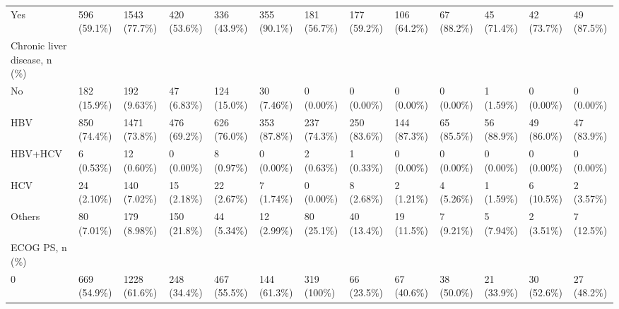 \begin{landscape}
\begin{center}
\begin{longtable}{p{6.0cm}p{3.0cm}p{3.0cm}p{3.0cm}p{3.0cm}p{3.0cm}p{3.0cm}p{3.0cm}p{3.0cm}p{3.0cm}p{3.0cm}p{3.0cm}p{3.0cm}}
    Yes &   596 (59.1\%)    &   1543 (77.7\%)   &   420 (53.6\%)    &   336 (43.9\%)    &   355 (90.1\%)    &   181 (56.7\%)    &   177 (59.2\%)    &   106 (64.2\%)    &    67 (88.2\%)    &    45 (71.4\%)    &    42 (73.7\%)    &    49 (87.5\%)    \\
Chronic liver disease, n (\%) &                  &                  &                  &                  &                  &                  &                  &                  &                  &                  &                  &                  \\
    No &   182 (15.9\%)    &   192 (9.63\%)    &    47 (6.83\%)    &   124 (15.0\%)    &    30 (7.46\%)    &    0 (0.00\%)     &    0 (0.00\%)     &    0 (0.00\%)     &    0 (0.00\%)     &    1 (1.59\%)     &    0 (0.00\%)     &    0 (0.00\%)     \\
    HBV &   850 (74.4\%)    &   1471 (73.8\%)   &   476 (69.2\%)    &   626 (76.0\%)    &   353 (87.8\%)    &   237 (74.3\%)    &   250 (83.6\%)    &   144 (87.3\%)    &    65 (85.5\%)    &    56 (88.9\%)    &    49 (86.0\%)    &    47 (83.9\%)    \\
    HBV+HCV &    6 (0.53\%)     &    12 (0.60\%)    &    0 (0.00\%)     &    8 (0.97\%)     &    0 (0.00\%)     &    2 (0.63\%)     &    1 (0.33\%)     &    0 (0.00\%)     &    0 (0.00\%)     &    0 (0.00\%)     &    0 (0.00\%)     &    0 (0.00\%)     \\
    HCV &    24 (2.10\%)    &   140 (7.02\%)    &    15 (2.18\%)    &    22 (2.67\%)    &    7 (1.74\%)     &    0 (0.00\%)     &    8 (2.68\%)     &    2 (1.21\%)     &    4 (5.26\%)     &    1 (1.59\%)     &    6 (10.5\%)     &    2 (3.57\%)     \\
    Others &    80 (7.01\%)    &   179 (8.98\%)    &   150 (21.8\%)    &    44 (5.34\%)    &    12 (2.99\%)    &    80 (25.1\%)    &    40 (13.4\%)    &    19 (11.5\%)    &    7 (9.21\%)     &    5 (7.94\%)     &    2 (3.51\%)     &    7 (12.5\%)     \\
ECOG PS, n (\%) &                  &                  &                  &                  &                  &                  &                  &                  &                  &                  &                  &                  \\
    0 &   669 (54.9\%)    &   1228 (61.6\%)   &   248 (34.4\%)    &   467 (55.5\%)    &   144 (61.3\%)    &    319 (100\%)    &    66 (23.5\%)    &    67 (40.6\%)    &    38 (50.0\%)    &    21 (33.9\%)    &    30 (52.6\%)    &    27 (48.2\%)    \\

\end{longtable}
\end{center}
\end{landscape}
